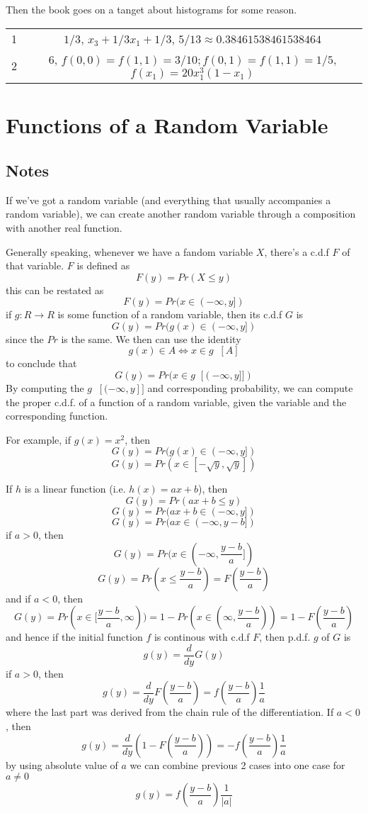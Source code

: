 \documentclass[11pt,oneside,titlepage]{book}
\DeclareMathOperator \inv {^{-1}}
\begin{document}
Then the book goes on a tanget about histograms for some reason.



\begin{tabular}[center]{||c | c|| }
  \hline
  1 & $1/3$,  $x_3 + 1/3 x_1 + 1/3$, $5/13 \approx 0.38461538461538464$\\
  2 & $6$, $f(0, 0) = f(1, 1) = 3/10; f(0, 1) = f(1, 1) = 1/5$, $f(x_1) = 20 x_1^3 (1 - x_1)$\\
  \hline 
\end{tabular}


\section{Functions of a Random Variable}

\subsection*{Notes}

If we've got a random variable (and everything that usually
accompanies a random variable), we can create another random variable
through a composition with another real function.

Generally speaking, whenever we have a fandom variable $X$, there's a
c.d.f $F$ of that variable. $F$ is defined as
$$F(y) = Pr(X \leq y)$$
this can be restated as
$$F(y) = Pr(x \in (-\infty, y])$$
if $g: R \to R$ is some function of a random variable, then its
c.d.f $G$ is
$$G(y) = Pr(g(x) \in (-\infty, y])$$
since the $Pr$ is the same. We then can use the identity
$$g(x) \in A \iff x \in g\inv[A]$$
to conclude that
$$G(y) = Pr(x \in g\inv[(-\infty, y]])$$
By computing the $g\inv[(-\infty, y]]$ and corresponding probability,
we can compute the proper c.d.f. of a function of a random variable,
given the variable and the corresponding function.

For example, if $g(x) = x^2$, then
$$G(y) = Pr(g(x) \in (-\infty, y])$$
$$G(y) = Pr(x \in [-\sqrt{y}, \sqrt{y}])$$

If $h$ is a linear function (i.e. $h(x) = ax + b$), then
$$G(y) = Pr(ax + b \leq y)$$
$$G(y) = Pr(ax + b \in (-\infty, y])$$
$$G(y) = Pr(ax \in (-\infty, y - b])$$
if $a > 0$, then 
$$G(y) = Pr(x \in (-\infty, \frac{y - b}{a}])$$
$$G(y) = Pr(x \leq \frac{y - b}{a}) = F(\frac{y - b}{a})$$
and if $a < 0$, then
$$G(y) = Pr(x \in [\frac{y - b}{a}, \infty)) =
1 - Pr(x \in (\infty, \frac{y - b}{a})) = 1 - F(\frac{y - b}{a})$$
and hence if the initial function $f$ is continous with c.d.f $F$,
then p.d.f. $g$ of $G$ is
$$g(y) = \frac{d}{dy}G(y)$$
if $a > 0$, then
$$g(y)= \frac{d}{dy}F(\frac{y - b}{a}) = f(\frac{y - b}{a}) \frac{1}{a}$$
where the last part was derived from the chain rule of the differentiation. 
If $a < 0$, then
$$g(y)= \frac{d}{dy}(1 - F(\frac{y - b}{a})) = -f(\frac{y - b}{a}) \frac{1}{a}$$
by using absolute value of $a$ we can combine previous 2 cases into
one case for $a \neq 0$
$$g(y) = f(\frac{y - b}{a}) \frac{1}{|a|}$$
\end{document}
